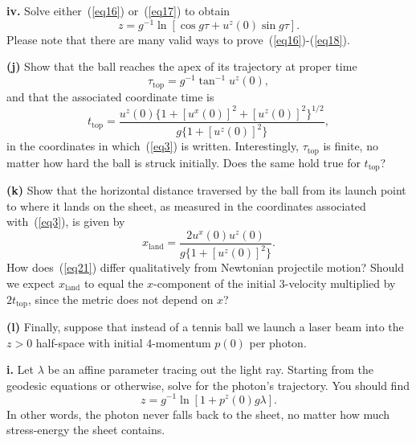 \documentclass[a4paper]{article} %
\begin{document}
\begin{framed}
\textbf{iv.} Solve either~(\ref{eq16}) or~(\ref{eq17}) to obtain
\begin{equation}
z=g^{-1}\ln[\cos g\tau+u^z(0)\sin g\tau].\label{eq18}
\end{equation}
Please note that there are many valid ways to prove~(\ref{eq16})-(\ref{eq18}).
\end{framed}

\begin{framed}
\textbf{(j)} Show that the ball reaches the apex of its trajectory at proper time
\begin{equation}
\tau_{\text{top}}=g^{-1}\tan^{-1}u^z(0),
\end{equation}
and that the associated coordinate time is
\begin{equation}
t_{\text{top}}=\frac{u^z(0)\{1+[u^x(0)]^2+[u^z(0)]^2\}^{1/2}}{g\{1+[u^z(0)]^2\}},
\end{equation}
in the coordinates in which~(\ref{eq3}) is written. Interestingly, $\tau_{\text{top}}$ is finite, no matter
how hard the ball is struck initially. Does the same hold true for $t_{\text{top}}$?
\end{framed}

\begin{framed}
\textbf{(k)} Show that the horizontal distance traversed by the ball from its launch point to where it lands on the sheet, as measured in the coordinates associated with~(\ref{eq3}), is given by
\begin{equation}
x_{\text{land}}=\frac{2u^x(0)u^z(0)}{g\{1+[u^z(0)]^2\}}.\label{eq21}
\end{equation}
How does~(\ref{eq21}) differ qualitatively from Newtonian projectile motion? Should we expect $x_{\text{land}}$ to equal the $x$-component of the initial 3-velocity multiplied by $2t_{\text{top}}$,
since the metric does not depend on $x$?
\end{framed}

\begin{framed}
\textbf{(l)} Finally, suppose that instead of a tennis ball we launch a laser beam into the $z > 0$ half-space with initial 4-momentum $p(0)$ per photon.
\end{framed}

\begin{framed}
\textbf{i.} Let $\lambda$ be an affine parameter tracing out the light ray. Starting from the geodesic equations or otherwise, solve for the photon’s trajectory. You should find
\begin{equation}
z=g^{-1}\ln[1+p^z(0)g\lambda].
\end{equation}
In other words, the photon never falls back to the sheet, no matter how much stress-energy the sheet contains.
\end{framed}
\end{document}
